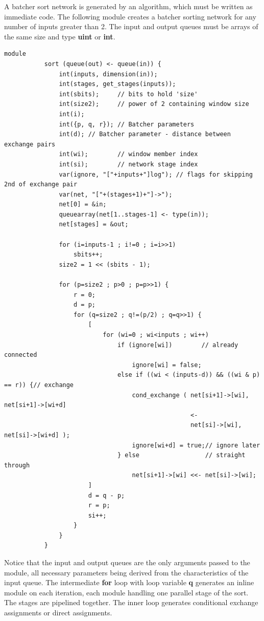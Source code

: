         A batcher sort network is generated by an
        algorithm, which must be written as immediate code. The following
        module creates a batcher sorting network for any number of inputs
        greater than 2. The input and output queues must be arrays of the same
        size and type {\bf uint} or {\bf int}.
        \begin{lstlisting}[gobble=8, language=threepl]
           module
           sort (queue(out) <- queue(in)) {
               int(inputs, dimension(in));
               int(stages, get_stages(inputs));
               int(sbits);     // bits to hold 'size'
               int(size2);     // power of 2 containing window size
               int(i);
               int({p, q, r}); // Batcher parameters
               int(d); // Batcher parameter - distance between exchange pairs
               int(wi);        // window member index
               int(si);        // network stage index
               var(ignore, "["+inputs+"]log"); // flags for skipping 2nd of exchange pair
               var(net, "["+(stages+1)+"]->");
               net[0] = &in;
               queuearray(net[1..stages-1] <- type(in));
               net[stages] = &out;

               for (i=inputs-1 ; i!=0 ; i=i>>1)
                   sbits++;
               size2 = 1 << (sbits - 1);

               for (p=size2 ; p>0 ; p=p>>1) {
                   r = 0;
                   d = p;
                   for (q=size2 ; q!=(p/2) ; q=q>>1) {
                       [
                           for (wi=0 ; wi<inputs ; wi++)
                               if (ignore[wi])        // already connected
                                   ignore[wi] = false;
                               else if ((wi < (inputs-d)) && ((wi & p) == r)) {// exchange
                                   cond_exchange ( net[si+1]->[wi], net[si+1]->[wi+d]
                                                   <-
                                                   net[si]->[wi], net[si]->[wi+d] );
                                   ignore[wi+d] = true;// ignore later
                               } else                  // straight through
                                   net[si+1]->[wi] <<- net[si]->[wi];
                       ]
                       d = q - p;
                       r = p;
                       si++;
                   }
               }
           }
        \end{lstlisting}
        Notice that the input and output queues are the only arguments passed
        to the module, all necessary parameters being derived from the
        characteristics of the input queue. The intermediate {\bf for} loop
        with loop variable {\bf q} generates an inline module on each
        iteration, each module handling one parallel stage of the sort. The
        stages are pipelined together. The inner loop generates conditional
        exchange assignments or direct assignments.
        
